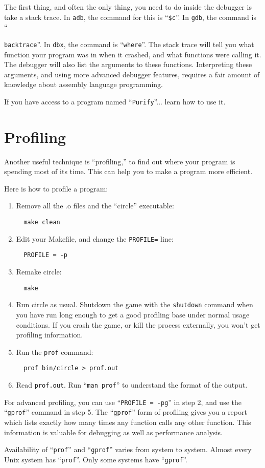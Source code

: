 \documentclass{article}
\begin{document}
The first thing, and often the only thing, you need to do inside the debugger is take a stack trace.   In \texttt{adb}, the command for this is ``\texttt{\$c}''.  In \texttt{gdb}, the command is ``{\texttt{backtrace}''.  In \texttt{dbx}, the command is ``\texttt{where}''.  The stack trace will tell you what function your program was in when it crashed, and what functions were calling it.  The debugger will also list the arguments to these functions. Interpreting these arguments, and using more advanced debugger features, requires a fair amount of knowledge about assembly language programming.
\par
If you have access to a program named ``\texttt{Purify}''... learn how to use it.

\section{Profiling}
Another useful technique is ``profiling,'' to find out where your program is spending most of its time.  This can help you to make a program more efficient.
\par
Here is how to profile a program:
\par
\begin{enumerate}
\item Remove all the .o files and the ``circle'' executable:
\begin{verbatim}
  make clean
\end{verbatim}
\item Edit your Makefile, and change the \texttt{PROFILE=} line:
\begin{verbatim}
  PROFILE = -p
\end{verbatim}
\item Remake circle:
\begin{verbatim}
  make
\end{verbatim}
\item Run circle as usual.  Shutdown the game with the \texttt{shutdown} command when you have run long enough to get a good profiling base under normal usage conditions.  If you crash the game, or kill the process externally, you won't get profiling information.
\item Run the \texttt{prof} command:
\begin{verbatim}
  prof bin/circle > prof.out
\end{verbatim}
\item Read \texttt{prof.out}.  Run ``\texttt{man prof}'' to understand the format of the output.
\end{enumerate}
For advanced profiling, you can use ``\texttt{PROFILE = -pg}'' in step 2, and use the ``\texttt{gprof}'' command in step 5.  The ``\texttt{gprof}'' form of profiling gives you a report which lists exactly how many times any function calls any other function.  This information is valuable for debugging as well as performance analysis.
\par
Availability of ``\texttt{prof}'' and ``\texttt{gprof}'' varies from system to system. Almost every Unix system has ``\texttt{prof}''.  Only some systems have ``\texttt{gprof}''.

}
\end{document}
